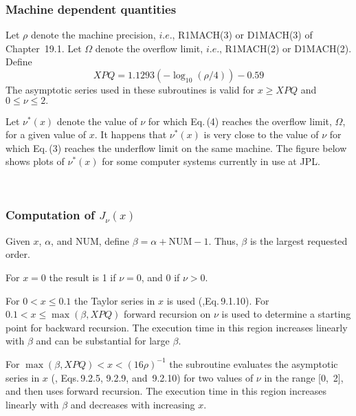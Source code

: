 \documentclass[twoside]{MATH77}
\begin{document}
\subsubsection{Machine dependent quantities}

Let $\rho $ denote the machine precision, $i.e.$, R1MACH(3) or
D1MACH(3) of Chapter~19.1. Let $\Omega $ denote the overflow limit, $i.e.$,
R1MACH(2) or D1MACH(2). Define
\begin{equation*}
\mathit{XPQ} = 1.1293(-\log _{10}(\rho /4)) - 0.59
\end{equation*}
The asymptotic series used in these subroutines is valid for $x \geq
\mathit{XPQ}$ and $0 \leq \nu \leq 2.$

Let $\nu ^*(x)$ denote the value of $\nu $ for which Eq.\,(4) reaches the overflow
limit, $\Omega $, for a given value of $x$. It happens that $\nu ^*(x)$ is very
close to the value of $\nu $ for which Eq.\,(3) reaches the underflow limit on the
same machine. The figure below shows plots of $\nu ^*(x)$ for some
computer systems currently in use at JPL.
\vspace{5pt}

\mbox{ }


\subsubsection{Computation of $J_\nu (x)$}

Given $x$, $\alpha $, and NUM, define $\beta = \alpha +\text{NUM} - 1$.
Thus, $\beta $ is the largest requested order.

For $x = 0$ the result is 1 if $\nu = 0$, and 0 if $\nu > 0.$

For $0 < x \leq 0.1$ the Taylor series in $x$ is used
(\cite{ams55:bes},Eq.\,9.1.10).  For $0.1 < x \leq \max (\beta ,
\mathit{XPQ})$ forward recursion on $\nu $ is used to determine a starting
point for backward recursion.  The execution time in this region increases
linearly with $\beta $ and can be substantial for large $\beta .$

For $\max (\beta , \mathit{XPQ}) < x < (16\rho )^{-1}$ the subroutine
evaluates the asymptotic series in $x$ (\cite{ams55:bes}, Eqs.\,9.2.5,
9.2.9, and~9.2.10) for two values of $\nu $ in the range [0,~2], and then
uses forward recursion.  The execution time in this region increases
linearly with $\beta $ and decreases with increasing $x.$
\end{document}
